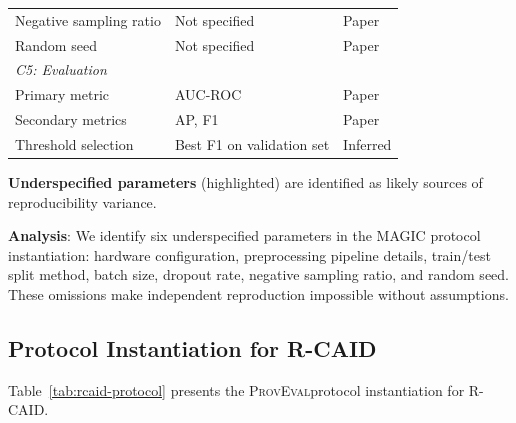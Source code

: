 \documentclass[11pt,a4paper]{article}
\newcommand{\system}[1]{\textsc{#1}}
\newcommand{\proveval}{\textsc{ProvEval}}
\begin{document}
\begin{table}[H]
\begin{threeparttable}
\begin{tabular}{@{}lll@{}}
\quad Negative sampling ratio & Not specified & Paper \\
\quad Random seed & Not specified & Paper \\
\midrule
\multicolumn{3}{l}{\textit{C5: Evaluation}} \\
\quad Primary metric & AUC-ROC & Paper \\
\quad Secondary metrics & AP, F1 & Paper \\
\quad Threshold selection & Best F1 on validation set & Inferred \\
\bottomrule
\end{tabular}
\begin{tablenotes}
\small
\item \textbf{Underspecified parameters} (highlighted) are identified as likely sources of reproducibility variance.
\end{tablenotes}
\end{threeparttable}
\end{table}

\textbf{Analysis}: We identify six underspecified parameters in the MAGIC protocol instantiation: hardware configuration, preprocessing pipeline details, train/test split method, batch size, dropout rate, negative sampling ratio, and random seed. These omissions make independent reproduction impossible without assumptions.

\subsection{Protocol Instantiation for R-CAID}

Table~\ref{tab:rcaid-protocol} presents the \proveval protocol instantiation for \system{R-CAID}.
\end{document}
